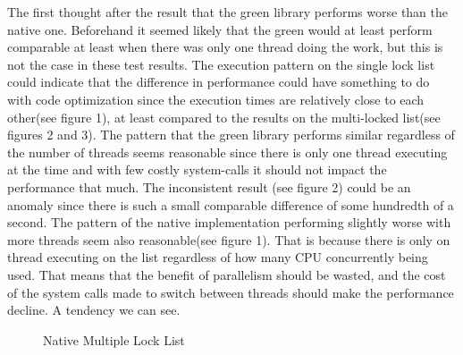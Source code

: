 \documentclass{article}
\begin{document}
The first thought after the result that the green library performs worse than the native one. Beforehand it seemed likely that the green would at least perform comparable at least when there was only one thread doing the work, but this is not the case in these test results. The execution pattern on the single lock list could indicate that the difference in performance could have something to do with code optimization since the execution times are relatively close to each other(see figure 1), at least compared to the results on the multi-locked list(see figures 2 and 3). 
The pattern that the green library performs similar regardless of the number of threads seems reasonable since there is only one thread executing at the time and with few costly system-calls it should not impact the performance that much. The inconsistent result (see figure 2) could be an anomaly since there is such a small comparable difference of some hundredth of a second. The pattern of the native implementation performing slightly worse with more threads seem also reasonable(see figure 1). That is because there is only on thread executing on the list regardless of how many CPU concurrently being used. That means that the benefit of parallelism should be wasted, and the cost of the system calls made to switch between threads should make the performance decline. A tendency we can see.

\begin{figure}
\hspace{4em}
\caption{Native Multiple Lock List}
\end{figure}
\end{document}
